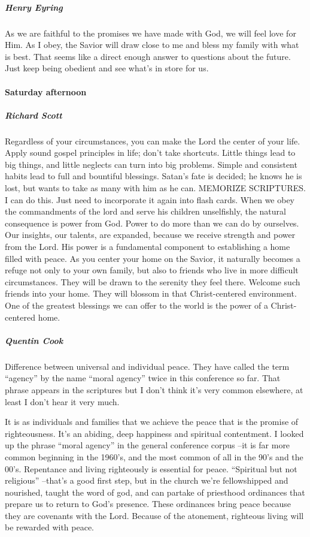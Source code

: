 \subparagraph*{Henry Eyring} As we are faithful to the promises we have made with God, we will feel love for Him. As I obey, the Savior will draw close to me and bless my family with what is best. That seems like a direct enough answer to questions about the future. Just keep being obedient and see what's in store for us.

\paragraph*{Saturday afternoon}

\subparagraph*{Richard Scott} Regardless of your circumstances, you can make the Lord the center of your life. Apply sound gospel principles in life; don't take shortcuts. Little things lead to big things, and little neglects can turn into big problems. Simple and consistent habits lead to full and bountiful blessings. Satan's fate is decided; he knows he is lost, but wants to take as many with him as he can. MEMORIZE SCRIPTURES. I can do this. Just need to incorporate it again into flash cards. When we obey the commandments of the lord and serve his children unselfishly, the natural consequence is power from God. Power to do more than we can do by ourselves. Our insights, our talents, are expanded, because we receive strength and power from the Lord. His power is a fundamental component to establishing a home filled with peace. As you center your home on the Savior, it naturally becomes a refuge not only to your own family, but also to friends who live in more difficult circumstances. They will be drawn to the serenity they feel there. Welcome such friends into your home. They will blossom in that Christ-centered environment. One of the greatest blessings we can offer to the world is the power of a Christ-centered home.

\subparagraph*{Quentin Cook} Difference between universal and individual peace. They have called the term ``agency'' by the name ``moral agency'' twice in this conference so far. That phrase appears in the scriptures but I don't think it's very common elsewhere, at least I don't hear it very much.

It is as individuals and families that we achieve the peace that is the promise of righteousness. It's an abiding, deep happiness and spiritual contentment. I looked up the phrase ``moral agency'' in the general conference corpus --it is far more common beginning in the 1960's, and the most common of all in the 90's and the 00's. Repentance and living righteously is essential for peace. ``Spiritual but not religious'' --that's a good first step, but in the church we're fellowshipped and nourished, taught the word of god, and can partake of priesthood ordinances that prepare us to return to God's presence. These ordinances bring peace because they are covenants with the Lord. Because of the atonement, righteous living will be rewarded with peace.

